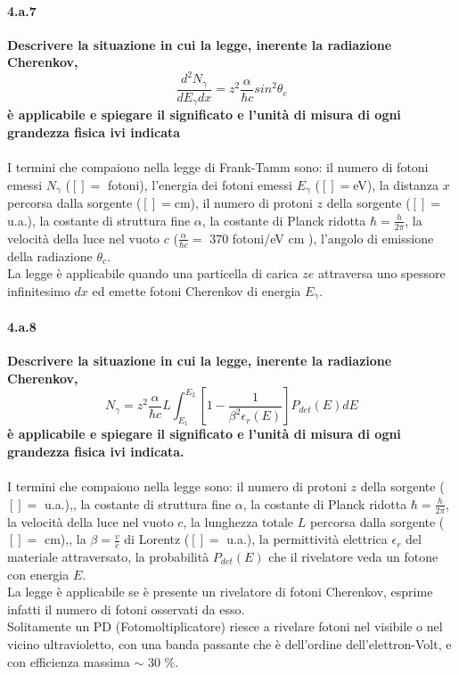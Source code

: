 \documentclass[twoside]{article}
\begin{document}
\paragraph{4.a.7}\textbf{Descrivere la situazione in cui la legge, inerente la radiazione Cherenkov,
\[
\frac{d^2 N_{\gamma}}{dE_{\gamma}dx}= z^2 \frac{\alpha}{\hbar c}sin^2\theta_c
\]
è applicabile e spiegare il significato e l'unità di misura di ogni grandezza fisica ivi indicata}\\
\\
I termini che compaiono nella legge di Frank-Tamm sono: il numero di fotoni emessi $N_\gamma$ ($[]=$ fotoni), l'energia dei fotoni emessi $E_\gamma$ ($[]=$eV), la distanza $x$ percorsa dalla sorgente ($[]=$cm), il numero di protoni $z$ della sorgente ($[]=$ u.a.), la costante di struttura fine $\alpha$, la costante di Planck ridotta $\hbar=\frac{h}{2\pi}$, la velocità della luce nel vuoto $c$ ($\frac{\alpha}{\hbar c}=$ 370 fotoni/eV cm ), l'angolo di emissione della radiazione $\theta_c$.\\
La legge è applicabile quando una particella di carica $ze$ attraversa uno spessore infinitesimo $dx$ ed emette fotoni Cherenkov di energia $E_{\gamma}$.

\paragraph{4.a.8}\textbf{Descrivere la situazione in cui la legge, inerente la radiazione Cherenkov,
\[
N_{\gamma}=z^2\frac{\alpha}{\hbar c}L\int_{E_1}^{E_2}\left[ 1-\frac{1}{\beta^2 \epsilon_r(E)} \right] P_{det}(E) dE
\]
è applicabile e spiegare il significato e l'unità di misura di ogni grandezza fisica ivi indicata.}\\
\\
I termini che compaiono nella legge sono: il numero di protoni $z$ della sorgente ($[]=$ u.a.),, la costante di struttura fine $\alpha$, la costante di Planck ridotta $\hbar=\frac{h}{2\pi}$, la velocità della luce nel vuoto $c$, la lunghezza totale $L$ percorsa dalla sorgente ($[]=$ cm),, la $\beta=\frac{v}{c}$ di Lorentz ($[]=$ u.a.), la permittività elettrica $\epsilon_r$ del materiale attraversato, la probabilità $P_{det}(E)$ che il rivelatore veda un fotone con energia $E$.\\
La legge è applicabile se è presente un rivelatore di fotoni Cherenkov, esprime infatti il numero di fotoni osservati da esso.\\
\warning Solitamente un PD (Fotomoltiplicatore) riesce a rivelare fotoni nel visibile o nel vicino ultravioletto, con una banda passante che è dell'ordine dell'elettron-Volt, e con efficienza massima $\sim$ 30 \%.
\end{document}
